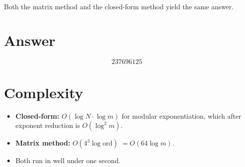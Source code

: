 \documentclass[11pt,a4paper]{article}
\begin{document}
Both the matrix method and the closed-form method yield the same answer.

\section{Answer}

\[
\boxed{237696125}
\]
\section{Complexity}

\begin{itemize}[nosep]
  \item \textbf{Closed-form:} $O(\log N \cdot \log m)$ for modular exponentiation,
        which after exponent reduction is $O(\log^2 m)$.
  \item \textbf{Matrix method:} $O(4^3 \log\mathrm{ord})$ $= O(64\log m)$.
  \item Both run in well under one second.
\end{itemize}
\end{document}
